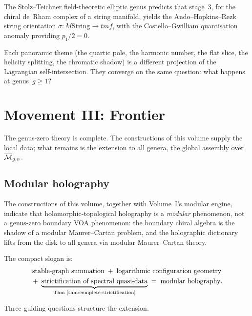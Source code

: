 The Stolz--Teichner field-theoretic elliptic genus predicts that stage~$3$,
for the chiral de~Rham complex of a string manifold,
yields the Ando--Hopkins--Rezk string orientation
$\sigma \colon M\mathrm{String} \to \mathit{tmf}$, with
the Costello--Gwilliam quantisation anomaly providing
$p_1/2 = 0$.

\medskip

Each panoramic theme (the quartic pole, the harmonic number, the
flat slice, the helicity splitting, the chromatic shadow) is a
different projection of the Lagrangian self-intersection.
They converge on the same question: what happens at genus~$g \ge 1$?

\section*{Movement III\@: Frontier}

The genus-zero theory is complete. The constructions
of this volume supply the local data; what remains is the extension
to all genera, the global assembly over $\overline{\mathcal M}_{g,n}$.

\subsection{Modular holography}
\label{subsec:modular-holography-programme}

The constructions of this volume, together with Volume~I's modular
engine, indicate that holomorphic-topological holography is a
\emph{modular} phenomenon, not a genus-zero boundary VOA phenomenon: the
boundary chiral algebra is the shadow of a modular Maurer--Cartan
problem, and the holographic dictionary lifts from the disk to all genera
via modular Maurer--Cartan theory.

The compact slogan is:
\begin{gather*}
 \text{stable-graph summation}
 \;+\;
 \text{logarithmic configuration geometry}\\
 {}+\;
 \underbrace{\text{strictification of spectral quasi-data}}_{\text{Thm~\ref{thm:complete-strictification}}}
 \;=\;
 \text{modular holography}.
\end{gather*}

Three guiding questions structure the extension.

